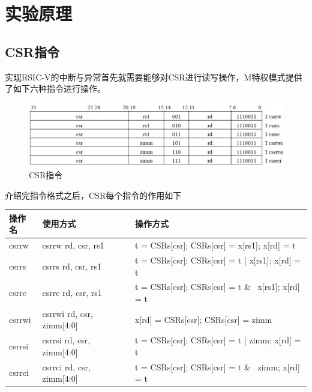
\section{实验原理}
\subsection{CSR指令}
实现RSIC-V的中断与异常首先就需要能够对CSR进行读写操作，M特权模式提供了如下六种指令进行操作。\\

\begin{figure}[H] %
    \centering %
    \includegraphics[width=1.0\textwidth]{figs/csr.png} %
    \caption{CSR指令} %
    \label{Fig.1} %
\end{figure}

介绍完指令格式之后，CSR每个指令的作用如下\\

\begin{tabular}{|l|l|l|}
    \hline
    操作名 & 使用方式 & 操作方式\\
    \hline
    csrrw & csrrw rd, csr, rs1 & t = CSRs[csr]; CSRs[csr] = x[rs1]; x[rd] = t \\
    \hline
    csrrs & csrrs rd, csr, rs1 & t = CSRs[csr]; CSRs[csr] = t | x[rs1]; x[rd] = t \\
    \hline
    csrrc & csrrc rd, csr, rs1  & t = CSRs[csr]; CSRs[csr] = t \& ~x[rs1]; x[rd] = t \\
    \hline
    csrrwi & csrrwi rd, csr, zimm[4:0] & x[rd] = CSRs[csr]; CSRs[csr] = zimm \\
    \hline
    csrrsi & csrrsi rd, csr, zimm[4:0] & t = CSRs[csr]; CSRs[csr] = t | zimm; x[rd] = t \\
    \hline 
    csrrci & csrrci rd, csr, zimm[4:0] & t = CSRs[csr]; CSRs[csr] = t \& ~zimm; x[rd] = t \\
    \hline
\end{tabular} \\


